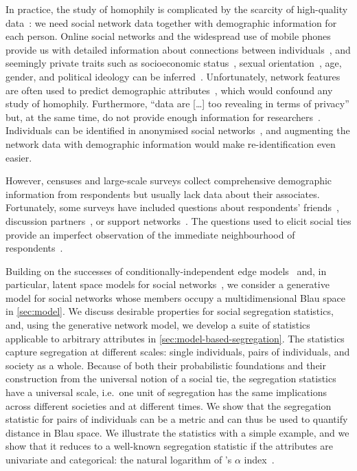 \documentclass{scrartcl}
\begin{document}
\begin{refsection}
In practice, the study of homophily is complicated by the scarcity of high-quality data~\cite{Butts2012, Blumenstock2013}: we need social network data together with demographic information for each person. Online social networks and the widespread use of mobile phones provide us with detailed information about connections between individuals~\cite{Golder2014}, and seemingly private traits such as socioeconomic status~\cite{Blumenstock2015, Luo2017}, sexual orientation~\cite{Wang2017}, age, gender, and political ideology can be inferred~\cite{Kosinski2013}. Unfortunately, network features are often used to predict demographic attributes~\cite{Wang2013,Blumenstock2015,Luo2017,Kosinski2013}, which would confound any study of homophily. Furthermore, ``data are [\ldots] too revealing in terms of privacy'' but, at the same time, do not provide enough information for researchers~\cite{Golder2014}. Individuals can be identified in anonymised social networks~\cite{Backstrom2011, Narayanan2008}, and augmenting the network data with demographic information would make re-identification even easier.

However, censuses and large-scale surveys collect comprehensive demographic information from respondents but usually lack data about their associates. Fortunately, some surveys have included questions about respondents' friends~\cite{Huckfeldt1983, Johnson1989}, discussion partners~\cite{Marsden1987, McPherson2006}, or support networks~\cite{Kalmijn2007, Banerjee2013}. The questions used to elicit social ties provide an imperfect observation of the immediate neighbourhood of respondents~\cite{Marin2004,Eagle2015,Eveland-Jr.2017}.

Building on the successes of conditionally-independent edge models~\cite{Snijders2011} and, in particular, latent space models for social networks~\cite{Hoff2002,Hoff2008}, we consider a generative model for social networks whose members occupy a multidimensional Blau space in \cref{sec:model}. We discuss desirable properties for social segregation statistics, and, using the generative network model, we develop a suite of statistics applicable to arbitrary attributes in \cref{sec:model-based-segregation}. The statistics capture segregation at different scales: single individuals, pairs of individuals, and society as a whole. Because of both their probabilistic foundations and their construction from the universal notion of a social tie, the segregation statistics have a universal scale, i.e.\ one unit of segregation has the same implications across different societies and at different times. We show that the segregation statistic for pairs of individuals can be a metric and can thus be used to quantify distance in Blau space. We illustrate the statistics with a simple example, and we show that it reduces to a well-known segregation statistic if the attributes are univariate and categorical: the natural logarithm of \citeauthor{Moody2001}'s $\alpha$ index~\cite{Moody2001}.


\end{refsection}
\end{document}

